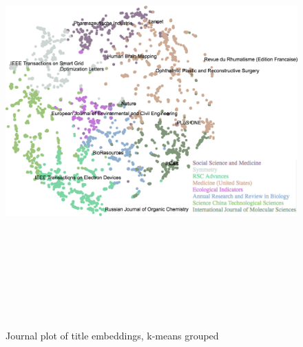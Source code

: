 \documentclass[../../Thesis.tex]{subfiles}
\begin{document}
\begin{landscape}
\begin{figure}
\begin{center}
\includegraphics[height=6.5in]{Plots/Journal_Plots/Title_grouped}
\end{center}
\caption{Journal plot of title embeddings, k-means grouped}\label{figure:titlePlotGrouped}
\end{figure}
\end{landscape}
\end{document}
